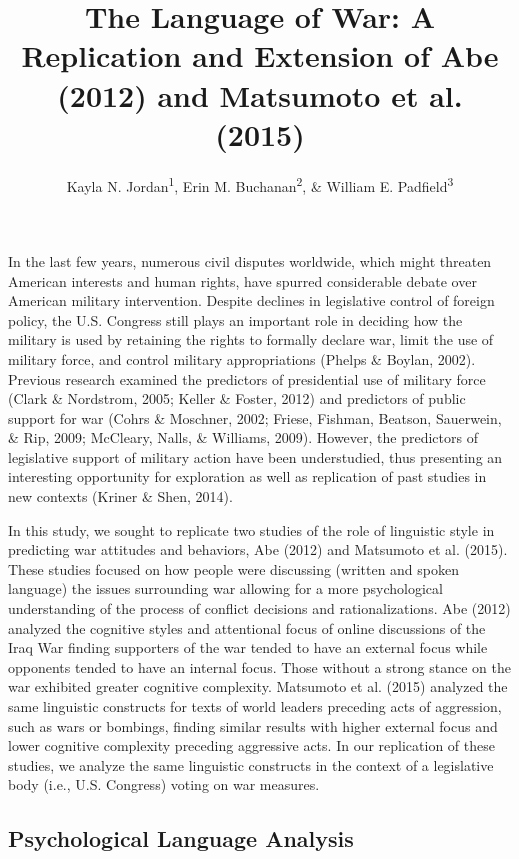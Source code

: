 \documentclass[english,,man,floatsintext]{apa6}
\title{The Language of War: A Replication and Extension of Abe (2012) and Matsumoto et al. (2015)}
\author{Kayla N. Jordan\textsuperscript{1}, Erin M. Buchanan\textsuperscript{2}, \& William E. Padfield\textsuperscript{3}}
\date{}
\affiliation{
\vspace{0.5cm}
\textsuperscript{1} University of Texas - Austin\\\textsuperscript{2} Harrisburg University of Science and Technology\\\textsuperscript{3} Missouri State University}
\begin{document}
\maketitle

In the last few years, numerous civil disputes worldwide, which might threaten American interests and human rights, have spurred considerable debate over American military intervention. Despite declines in legislative control of foreign policy, the U.S. Congress still plays an important role in deciding how the military is used by retaining the rights to formally declare war, limit the use of military force, and control military appropriations (Phelps \& Boylan, 2002). Previous research examined the predictors of presidential use of military force (Clark \& Nordstrom, 2005; Keller \& Foster, 2012) and predictors of public support for war (Cohrs \& Moschner, 2002; Friese, Fishman, Beatson, Sauerwein, \& Rip, 2009; McCleary, Nalls, \& Williams, 2009). However, the predictors of legislative support of military action have been understudied, thus presenting an interesting opportunity for exploration as well as replication of past studies in new contexts (Kriner \& Shen, 2014).

In this study, we sought to replicate two studies of the role of linguistic style in predicting war attitudes and behaviors, Abe (2012) and Matsumoto et al. (2015). These studies focused on how people were discussing (written and spoken language) the issues surrounding war allowing for a more psychological understanding of the process of conflict decisions and rationalizations. Abe (2012) analyzed the cognitive styles and attentional focus of online discussions of the Iraq War finding supporters of the war tended to have an external focus while opponents tended to have an internal focus. Those without a strong stance on the war exhibited greater cognitive complexity. Matsumoto et al. (2015) analyzed the same linguistic constructs for texts of world leaders preceding acts of aggression, such as wars or bombings, finding similar results with higher external focus and lower cognitive complexity preceding aggressive acts. In our replication of these studies, we analyze the same linguistic constructs in the context of a legislative body (i.e., U.S. Congress) voting on war measures.

\hypertarget{psychological-language-analysis}{%
\subsection{Psychological Language Analysis}\label{psychological-language-analysis}}
\end{document}
